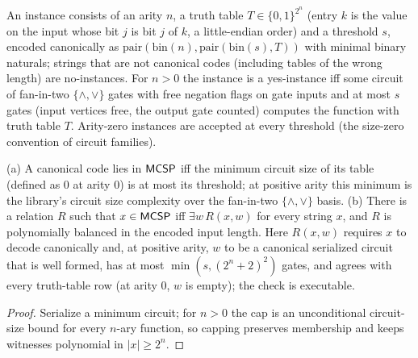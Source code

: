 \begin{definition}[$\cc{MCSP}$]
  \label{def:meta-mcsp}
  \leanok
  An instance consists of an arity $n$, a truth table $T \in \{0,1\}^{2^n}$
  (entry $k$ is the value on the input whose bit $j$ is bit $j$ of $k$, a
  little-endian order) and a threshold $s$, encoded canonically as
  $\mathrm{pair}(\mathrm{bin}(n), \mathrm{pair}(\mathrm{bin}(s), T))$ with
  minimal binary naturals; strings that are not canonical codes (including
  tables of the wrong length) are no-instances. For $n > 0$ the instance is a
  yes-instance iff some circuit of fan-in-two $\{\wedge,\vee\}$ gates with
  free negation flags on gate inputs and at most $s$ gates (input vertices
  free, the output gate counted) computes the
  function with truth table $T$. Arity-zero instances are accepted at every
  threshold (the size-zero convention of circuit families).
\end{definition}

\begin{theorem}
  \label{thm:meta-mcsp-witness}
  \leanok
  (a) A canonical code lies in $\cc{MCSP}$ iff the minimum circuit size of its
  table (defined as $0$ at arity $0$) is at most its threshold; at positive
  arity this minimum is the library's circuit size complexity over the
  fan-in-two $\{\wedge,\vee\}$ basis. (b) There is a relation $R$ such that
  $x \in \mathsf{MCSP}$ iff $\exists w\, R(x, w)$ for every string $x$, and $R$ is
  polynomially balanced in the encoded input length. Here $R(x, w)$ requires
  $x$ to decode canonically and, at positive arity, $w$ to be a canonical
  serialized circuit that is well formed, has at most $\min(s, (2^n+2)^2)$
  gates, and agrees with every truth-table row (at arity $0$, $w$ is empty);
  the check is executable.
\end{theorem}
\begin{proof}
  \leanok
  Serialize a minimum circuit; for $n > 0$ the cap is an unconditional
  circuit-size bound for every $n$-ary function, so capping preserves
  membership and keeps witnesses polynomial in $|x| \ge 2^n$.
\end{proof}


